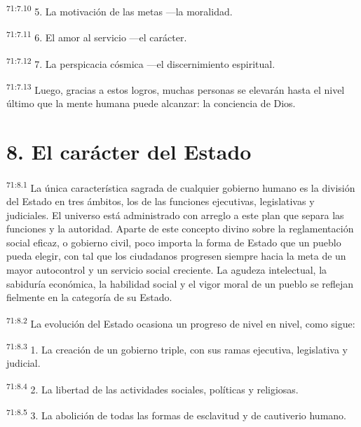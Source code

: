 \documentclass[twoside, 11pt]{book}
\begin{document}
\par
\textsuperscript{71:7.10} 5. La motivación de las metas ---la moralidad.

\par
\textsuperscript{71:7.11} 6. El amor al servicio ---el carácter.

\par
\textsuperscript{71:7.12} 7. La perspicacia cósmica ---el discernimiento espiritual.

\par
\textsuperscript{71:7.13} Luego, gracias a estos logros, muchas personas se elevarán hasta el nivel último que la mente humana puede alcanzar: la conciencia de Dios.

\section*{8. El carácter del Estado}
\par
\textsuperscript{71:8.1} La única característica sagrada de cualquier gobierno humano es la división del Estado en tres ámbitos, los de las funciones ejecutivas, legislativas y judiciales. El universo está administrado con arreglo a este plan que separa las funciones y la autoridad. Aparte de este concepto divino sobre la reglamentación social eficaz, o gobierno civil, poco importa la forma de Estado que un pueblo pueda elegir, con tal que los ciudadanos progresen siempre hacia la meta de un mayor autocontrol y un servicio social creciente. La agudeza intelectual, la sabiduría económica, la habilidad social y el vigor moral de un pueblo se reflejan fielmente en la categoría de su Estado.

\par
\textsuperscript{71:8.2} La evolución del Estado ocasiona un progreso de nivel en nivel, como sigue:

\par
\textsuperscript{71:8.3} 1. La creación de un gobierno triple, con sus ramas ejecutiva, legislativa y judicial.

\par
\textsuperscript{71:8.4} 2. La libertad de las actividades sociales, políticas y religiosas.

\par
\textsuperscript{71:8.5} 3. La abolición de todas las formas de esclavitud y de cautiverio humano.
\end{document}
